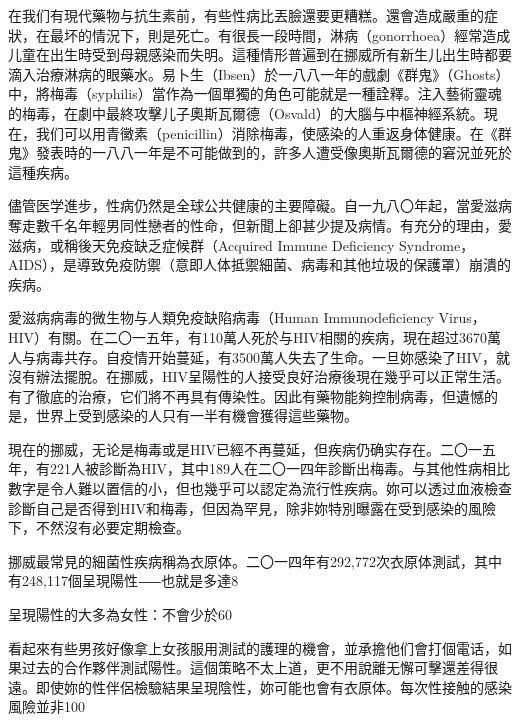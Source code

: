 \documentclass[12pt,UTF8]{ctexbook}
\begin{document}
在我们有現代藥物与抗生素前，有些性病比丟臉還要更糟糕。還會造成嚴重的症狀，在最坏的情況下，則是死亡。有很長一段時間，淋病（gonorrhoea）經常造成儿童在出生時受到母親感染而失明。這種情形普遍到在挪威所有新生儿出生時都要滴入治療淋病的眼藥水。易卜生（Ibsen）於一八八一年的戲劇《群鬼》（Ghosts）中，將梅毒（syphilis）當作為一個單獨的角色可能就是一種詮釋。注入藝術靈魂的梅毒，在劇中最終攻擊儿子奧斯瓦爾德（Osvald）的大腦与中樞神經系統。現在，我们可以用青黴素（penicillin）消除梅毒，使感染的人重返身体健康。在《群鬼》發表時的一八八一年是不可能做到的，許多人遭受像奧斯瓦爾德的窘況並死於這種疾病。

儘管医学進步，性病仍然是全球公共健康的主要障礙。自一九八〇年起，當愛滋病奪走數千名年輕男同性戀者的性命，但新聞上卻甚少提及病情。有充分的理由，愛滋病，或稱後天免疫缺乏症候群（Acquired Immune Deficiency Syndrome，AIDS），是導致免疫防禦（意即人体抵禦細菌、病毒和其他垃圾的保護罩）崩潰的疾病。

愛滋病病毒的微生物与人類免疫缺陷病毒（Human Immunodeficiency Virus，HIV）有關。在二〇一五年，有110萬人死於与HIV相關的疾病，現在超过3670萬人与病毒共存。自疫情开始蔓延，有3500萬人失去了生命。一旦妳感染了HIV，就沒有辦法擺脫。在挪威，HIV呈陽性的人接受良好治療後現在幾乎可以正常生活。有了徹底的治療，它们將不再具有傳染性。因此有藥物能夠控制病毒，但遺憾的是，世界上受到感染的人只有一半有機會獲得這些藥物。

現在的挪威，无论是梅毒或是HIV已經不再蔓延，但疾病仍确实存在。二〇一五年，有221人被診斷為HIV，其中189人在二〇一四年診斷出梅毒。与其他性病相比數字是令人難以置信的小，但也幾乎可以認定為流行性疾病。妳可以透过血液檢查診斷自己是否得到HIV和梅毒，但因為罕見，除非妳特別曝露在受到感染的風險下，不然沒有必要定期檢查。

挪威最常見的細菌性疾病稱為衣原体。二〇一四年有292‚772次衣原体測試，其中有248‚117個呈現陽性⸺也就是多達8%

呈現陽性的大多為女性：不會少於60%

看起來有些男孩好像拿上女孩服用測試的護理的機會，並承擔他们會打個電话，如果过去的合作夥伴測試陽性。這個策略不太上道，更不用說離无懈可擊還差得很遠。即使妳的性伴侶檢驗結果呈現陰性，妳可能也會有衣原体。每次性接触的感染風險並非100%
\end{document}
